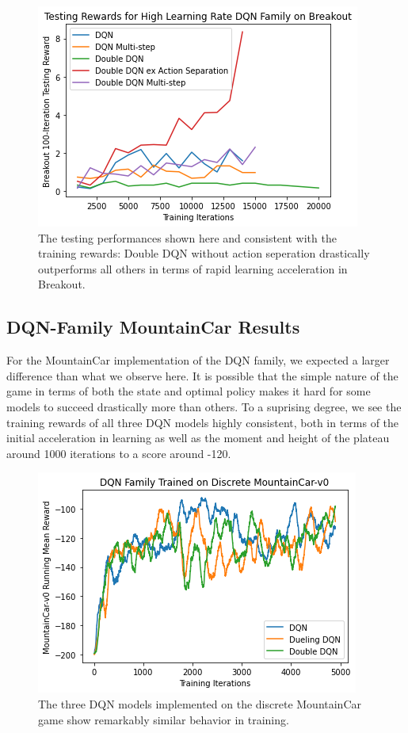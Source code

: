 \documentclass[conference]{IEEEtran}
\begin{document}
\begin{figure}
\centerline{\includegraphics[scale=0.6]{DQNs_breakout_high.png}}
\caption{The testing performances shown here and consistent with the training rewards: Double DQN without action seperation drastically outperforms all others in terms of rapid learning acceleration in Breakout.}
\end{figure}

\subsection{DQN-Family MountainCar Results}
For the MountainCar implementation of the DQN family, we expected a larger difference than what we observe here. It is possible that the simple nature of the game in terms of both the state and optimal policy makes it hard for some models to succeed drastically more than others. To a suprising degree, we see the training rewards of all three DQN models highly consistent, both in terms of the initial acceleration in learning as well as the moment and height of the plateau around 1000 iterations to a score around -120.

\begin{figure}
\centerline{\includegraphics[scale=0.6]{DQN_family_car.png}}
\caption{The three DQN models implemented on the discrete MountainCar game show remarkably similar behavior in training.}
\end{figure}
\end{document}
